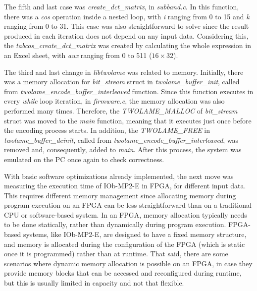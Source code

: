 \begin{comment}
\begin{figure}[H]
\centerline{\texttt{[image: fft.pdf]}}
\caption{\textit{psycho\_3\_fft} function.}
\label{fft}
\end{figure}

\vspace{1cm}
\end{comment}

The fifth and last case was \textit{create\_dct\_matrix}, in \textit{subband.c}. In this function, there was a \textit{cos} operation inside a nested loop, with \textit{i} ranging from 0 to 15 and \textit{k} ranging from 0 to 31. This case was also straightforward to solve since the result produced in each iteration does not depend on any input data. Considering this, the \textit{tabcos\_create\_dct\_matrix} was created by calculating the whole expression in an Excel sheet, with \textit{aux} ranging from 0 to 511 ($16 \times 32$).

\begin{comment}
\begin{figure}[H]
\centerline{\fbox{\texttt{[image: dct.pdf]}}}
\caption{\textit{create\_dct\_matrix} function.}
\label{dct}
\end{figure}

\vspace{1cm}
\end{comment}

The third and last change in \textit{libtwolame} was related to memory.
Initially, there was a memory allocation for \textit{bit\_stream} struct in \textit{twolame\_buffer\_init}, called from \textit{twolame\_encode\_buffer\_interleaved} function. Since this function executes in every \textit{while} loop iteration, in \textit{firmware.c}, the memory allocation was also performed many times.
Therefore, the \textit{TWOLAME\_MALLOC} of \textit{bit\_stream} struct was moved to the \textit{main} function, meaning that it executes just once before the encoding process starts.
In addition, the \textit{TWOLAME\_FREE} in \textit{twolame\_buffer\_deinit}, called from \textit{twolame\_encode\_buffer\_interleaved}, was removed and, consequently, added to \textit{main}. 
After this process, the system was emulated on the PC once again to check correctness.

With basic software optimizations already implemented, the next move was measuring the execution time of IOb-MP2-E in FPGA, for different input data. 
This requires different memory management since allocating memory during program execution on an FPGA can be less straightforward than on a traditional CPU or software-based system. In an FPGA, memory allocation typically needs to be done statically, rather than dynamically during program execution. FPGA-based systems, like IOb-MP2-E, are designed to have a fixed memory structure, and memory is allocated during the configuration of the FPGA (which is static once it is programmed) rather than at runtime. 
That said, there are some scenarios where dynamic memory allocation is possible on an FPGA, in case they provide memory blocks that can be accessed and reconfigured during runtime, but this is usually limited in capacity and not that flexible.

